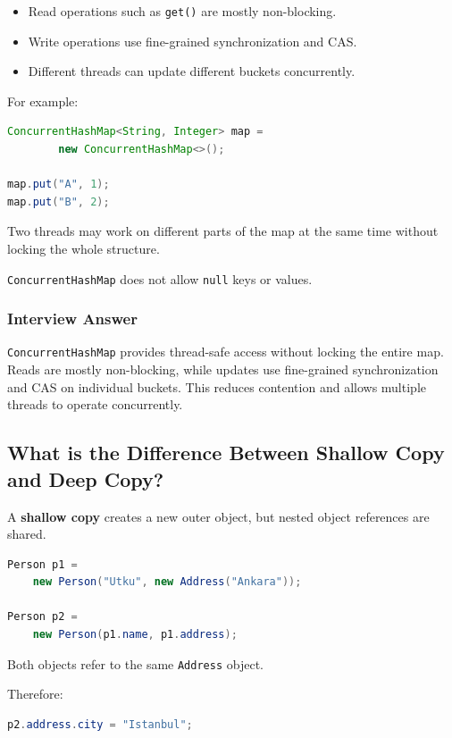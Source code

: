 \documentclass[12pt,a4paper]{article}
\begin{document}
\begin{itemize}
    \item Read operations such as \texttt{get()} are mostly non-blocking.
    \item Write operations use fine-grained synchronization and CAS.
    \item Different threads can update different buckets concurrently.
\end{itemize}

For example:

\begin{lstlisting}[language=Java]
ConcurrentHashMap<String, Integer> map =
        new ConcurrentHashMap<>();

map.put("A", 1);
map.put("B", 2);
\end{lstlisting}

Two threads may work on different parts of the map at the same time without
locking the whole structure.

\texttt{ConcurrentHashMap} does not allow \texttt{null} keys or values.

\subsubsection*{Interview Answer}

\texttt{ConcurrentHashMap} provides thread-safe access without locking the
entire map. Reads are mostly non-blocking, while updates use fine-grained
synchronization and CAS on individual buckets. This reduces contention and
allows multiple threads to operate concurrently.

\subsection{What is the Difference Between Shallow Copy and Deep Copy?}

A \textbf{shallow copy} creates a new outer object, but nested object
references are shared.

\begin{lstlisting}[language=Java]
Person p1 =
    new Person("Utku", new Address("Ankara"));

Person p2 =
    new Person(p1.name, p1.address);
\end{lstlisting}

Both objects refer to the same \texttt{Address} object.

Therefore:

\begin{lstlisting}[language=Java]
p2.address.city = "Istanbul";
\end{lstlisting}
\end{document}
